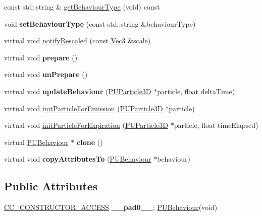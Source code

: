 \begin{DoxyCompactItemize}
\item 
const std\+::string \& \hyperlink{classPUBehaviour_a9874198e06f7c5a2682f9811a2811b36}{get\+Behaviour\+Type} (void) const
\item 
\mbox{\label{classPUBehaviour_aa5771166179f007006827b90ed65f28d}} 
void {\bfseries set\+Behaviour\+Type} (const std\+::string \&behaviour\+Type)
\item 
virtual void \hyperlink{classPUBehaviour_ae2544d7f4a7a98e06c5ea9cedd1085ab}{notify\+Rescaled} (const \hyperlink{classVec3}{Vec3} \&scale)
\item 
\mbox{\label{classPUBehaviour_a19d5cf43adb034e0b6d4a64f030175b5}} 
virtual void {\bfseries prepare} ()
\item 
\mbox{\label{classPUBehaviour_aa60e0077f8c3c676a3a71be761f57c7f}} 
virtual void {\bfseries un\+Prepare} ()
\item 
\mbox{\label{classPUBehaviour_aa97bf1e4a25bbffe27aaaba02d322d0c}} 
virtual void {\bfseries update\+Behaviour} (\hyperlink{structPUParticle3D}{P\+U\+Particle3D} $\ast$particle, float delta\+Time)
\item 
virtual void \hyperlink{classPUBehaviour_a5c83754c53ffd80e9f7b2306ba08b08e}{init\+Particle\+For\+Emission} (\hyperlink{structPUParticle3D}{P\+U\+Particle3D} $\ast$particle)
\item 
virtual void \hyperlink{classPUBehaviour_ab77067227834ed42729100f564e34ade}{init\+Particle\+For\+Expiration} (\hyperlink{structPUParticle3D}{P\+U\+Particle3D} $\ast$particle, float time\+Elapsed)
\item 
\mbox{\label{classPUBehaviour_a428cdc0c86c43c3d9e6e85d50857eda0}} 
virtual \hyperlink{classPUBehaviour}{P\+U\+Behaviour} $\ast$ {\bfseries clone} ()
\item 
\mbox{\label{classPUBehaviour_a26bf6c72b05896bbaaff904155eca4df}} 
virtual void {\bfseries copy\+Attributes\+To} (\hyperlink{classPUBehaviour}{P\+U\+Behaviour} $\ast$behaviour)
\end{DoxyCompactItemize}
\subsection*{Public Attributes}
\begin{DoxyCompactItemize}
\item 
\mbox{\label{classPUBehaviour_a5a25ddbd786852e445175132a01a8112}} 
\hyperlink{_2cocos2d_2cocos_2base_2ccConfig_8h_a25ef1314f97c35a2ed3d029b0ead6da0}{C\+C\+\_\+\+C\+O\+N\+S\+T\+R\+U\+C\+T\+O\+R\+\_\+\+A\+C\+C\+E\+SS} {\bfseries \+\_\+\+\_\+pad0\+\_\+\+\_\+}\+: \hyperlink{classPUBehaviour}{P\+U\+Behaviour}(void)
\end{DoxyCompactItemize}
